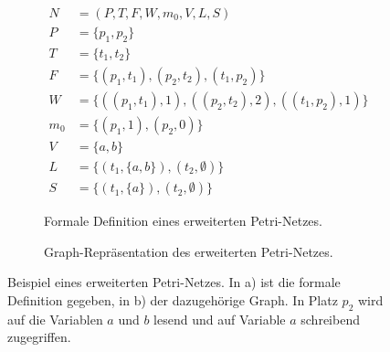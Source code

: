 \begin{figure}
\centering
	\begin{subfigure}[b]{.49\textwidth}
		$\begin{aligned}
			N &= (P,T,F,W,m_0, V, L, S)\\
			P &= \{p_1, p_2\}\\
			T &= \{t_1, t_2\}\\
			F &= \{(p_1, t_1), (p_2, t_2), (t_1, p_2)\}\\
			W &= \{((p_1, t_1),1), ((p_2, t_2),2), ((t_1, p_2), 1)\}\\
			m_0 &= \{(p_1, 1), (p_2, 0)\}\\
			V &= \{a,b\}\\
			L &= \{(t_1,\{a,b\}), (t_2,\emptyset)\}\\
			S &= \{(t_1,\{a\}), (t_2,\emptyset)\}
		\end{aligned}$
		\caption{Formale Definition eines erweiterten Petri-Netzes.}\label{fig:augpetrinet:formal}
	\end{subfigure}
	\hfill
	\begin{subfigure}[b]{.49\textwidth}
		\caption{Graph-Repräsentation des erweiterten Petri-Netzes.}\label{fig:augpetrinet:graph}
	\end{subfigure}
	\caption[Beispiel eines erweiterten Petri-Netzes.]{Beispiel eines erweiterten Petri-Netzes. In a) ist die formale Definition gegeben, in b) der dazugehörige Graph. In Platz $p_2$ wird auf die Variablen $a$ und $b$ lesend und auf Variable $a$ schreibend zugegriffen.}\label{fig:augpetrinet}
\end{figure}